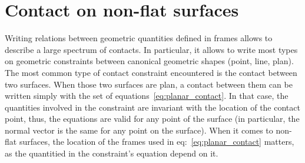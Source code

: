 
\section{Contact on non-flat surfaces}
\label{sec:contact_on_non_flat_surfaces}

Writing relations between geometric quantities defined in frames allows to describe a large spectrum of contacts.
In particular, it allows to write most types on geometric constraints between canonical geometric shapes (point, line, plan).
The most common type of contact constraint encountered is the contact between two surfaces.
When those two surfaces are plan, a contact between them can be written simply with the set of equations~\ref{eq:planar_contact}.
In that case, the quantities involved in the constraint are invariant with the location of the contact point, thus, the equations are valid for any point of the surface (in particular, the normal vector is the same for any point on the surface).
When it comes to non-flat surfaces, the location of the frames used in eq:~\ref{eq:planar_contact} matters, as the quantitied in the constraint's equation depend on it.




